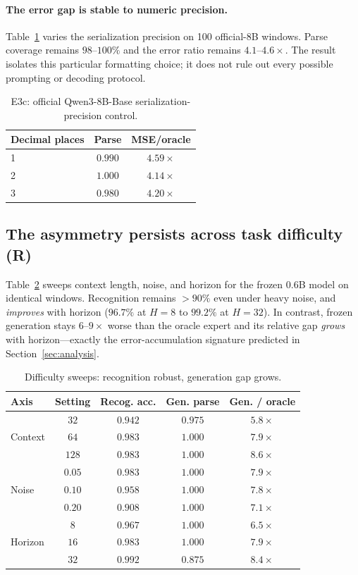 \documentclass{article}
\begin{document}
\paragraph{The error gap is stable to numeric precision.}
Table~\ref{tab:genrob} varies the serialization precision on 100 official-8B
windows.  Parse coverage remains $98$--$100\%$ and the error ratio remains
$4.1$--$4.6\times$.  The result isolates this particular formatting choice;
it does not rule out every possible prompting or decoding protocol.

\begin{table}[t]
\centering
\small
\begin{tabular}{lcc}
\toprule
Decimal places & Parse & MSE/oracle \\
\midrule
1 & $0.990$ & $4.59\times$ \\
2 & $1.000$ & $4.14\times$ \\
3 & $0.980$ & $4.20\times$ \\
\bottomrule
\end{tabular}
\caption{E3c: official Qwen3-8B-Base serialization-precision control.}
\label{tab:genrob}
\end{table}

\subsection{The asymmetry persists across task difficulty (R)}
Table~\ref{tab:asym} sweeps context length, noise, and horizon for the frozen
$0.6$B model on identical windows.  Recognition remains $>90\%$ even under
heavy noise, and \emph{improves} with horizon ($96.7\%$ at $H{=}8$ to $99.2\%$
at $H{=}32$).  In contrast, frozen generation stays $6$--$9\times$ worse than
the oracle expert and its relative gap \emph{grows} with horizon---exactly the
error-accumulation signature predicted in Section~\ref{sec:analysis}.

\begin{table}[t]
\centering
\small
\begin{tabular}{lcccc}
\toprule
Axis & Setting & Recog. acc. & Gen. parse & Gen. / oracle \\
\midrule
\multirow{3}{*}{Context} & $32$ & $0.942$ & $0.975$ & $5.8\times$ \\
 & $64$ & $0.983$ & $1.000$ & $7.9\times$ \\
 & $128$ & $0.983$ & $1.000$ & $8.6\times$ \\
\midrule
\multirow{3}{*}{Noise} & $0.05$ & $0.983$ & $1.000$ & $7.9\times$ \\
 & $0.10$ & $0.958$ & $1.000$ & $7.8\times$ \\
 & $0.20$ & $0.908$ & $1.000$ & $7.1\times$ \\
\midrule
\multirow{3}{*}{Horizon} & $8$ & $0.967$ & $1.000$ & $6.5\times$ \\
 & $16$ & $0.983$ & $1.000$ & $7.9\times$ \\
 & $32$ & $0.992$ & $0.875$ & $8.4\times$ \\
\bottomrule
\end{tabular}
\caption{Difficulty sweeps: recognition robust, generation gap grows.}
\label{tab:asym}
\end{table}
\end{document}
